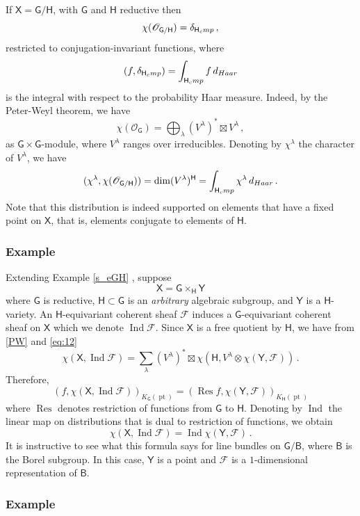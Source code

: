 \documentclass[14pt]{extarticle}
\newcommand{\bG}{\mathsf{G}}
\newcommand{\bH}{\mathsf{H}}
\newcommand{\bY}{\mathsf{Y}}
\newcommand{\bB}{\mathsf{B}}
\newcommand{\bX}{\mathsf{X}}
\newcommand{\cF}{\mathscr{F}}
\newcommand{\cO}{\mathscr{O}}
\newcommand{\comp}{\textup{cmp}}
\DeclareMathOperator{\Res}{Res}
\DeclareMathOperator{\Ind}{Ind}
\DeclareMathOperator{\pt}{pt}
\theoremstyle{definition}
\begin{document}
If $\bX=\bG/\bH$, with $\bG$ and $\bH$ reductive then 
\[
  \chi(\cO_{\bG/\bH}) = \delta_{\bH_\comp} \,,
\]
restricted to conjugation-invariant functions, where
\[
  (f, \delta_{\bH_\comp}) = \int_{\bH_\comp} f \, d_{\textup{Haar}}
\]
is the integral with respect to the probability Haar measure.
Indeed, by the Peter-Weyl theorem, we have
%
\begin{equation}
  \label{PW}
  \chi(\cO_{\bG}) = \bigoplus_{\lambda} \left(V^\lambda\right)^* \boxtimes
  V^\lambda \,, 
\end{equation}
%
as $\bG\times \bG$-module, where $V^\lambda$ ranges over irreducibles.
Denoting by $\chi^\lambda$ the character of $V^\lambda$, we have 
\[
  (\chi^\lambda, \chi(\cO_{\bG/\bH})) = \dim (V^\lambda)^\bH 
= \int_{\bH_\comp} \chi^\lambda \, d_{\textup{Haar}}\,.
\]
Note that this distribution is indeed supported on elements that have
a fixed point on $\bX$, that is, elements conjugate to elements of
$\bH$.   

\subsubsection{Example}\label{s_eGHY} 

Extending Example \ref{s_eGH} , suppose 
\[
  \bX = \bG \times_\bH \bY
\]
where $\bG$ is reductive, $\bH \subset \bG$ is an \emph{arbitrary}
algebraic subgroup, and $\bY$ is a $\bH$-variety. An $\bH$-equivariant
coherent sheaf $\cF$ induces a $\bG$-equivariant coherent sheaf on
$\bX$ which we denote $\Ind \cF$. Since $\bX$ is a free quotient by
$\bH$, 
we have from \eqref{PW} and \eqref{eq:12} 
\[
  \chi(\bX,\Ind \cF) = \sum_{\lambda} 
\left(V^\lambda\right)^*  \boxtimes \chi(\bH,  V^\lambda \otimes
\chi(\bY,\cF))\,. 
\]
Therefore, 
\[
  (f, \chi(\bX,\Ind \cF))_{K_\bG(\pt)} = (\Res f, \chi(\bY,
\cF))_{K_\bH(\pt)}
\]
where $\Res$ denotes restriction of functions from $\bG$ to
$\bH$. Denoting by $\Ind$ the linear map on distributions that is dual
to restriction of functions, we obtain 
%
\begin{equation}
  \label{eq:1}
  \chi(\bX,\Ind \cF) = \Ind \chi(\bY, \cF) \,. 
\end{equation}
%
It is instructive to see what this formula says for line bundles on
$\bG/\bB$, where $\bB$ is the Borel subgroup. In this case, $\bY$ is a
point and $\cF$ is a $1$-dimensional representation of $\bB$. 

\subsubsection{Example}\label{ex_C1} 
\end{document}

